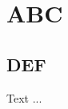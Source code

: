 \documentclass[a4paper,12pt]{article}
\begin{document}


\clearpage

\tableofcontents

\clearpage

\section{ABC}

\subsection{DEF}

Text ...  

\printbibliography
\end{document}
